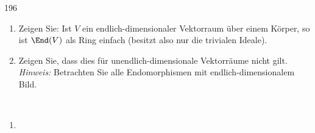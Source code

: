 \begin{algebraUE}{196}
\begin{enumerate}
  \item Zeigen Sie: Ist $V$ ein endlich-dimensionaler Vektorraum über einem
  Körper, so ist $\End(V)$ als Ring einfach (besitzt also nur die trivialen Ideale).
  \item Zeigen Sie, dass dies für unendlich-dimensionale Vektorräume nicht gilt. \\
  \textit{Hinweis:} Betrachten Sie alle Endomorphismen mit endlich-dimensionalem Bild.
\end{enumerate}
\end{algebraUE}
\begin{solution}
\leavevmode \\
\begin{enumerate}
  \item
\end{enumerate}
\end{solution}
